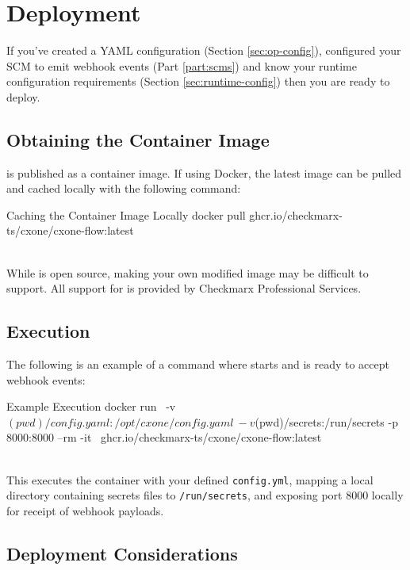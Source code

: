 \chapter{Deployment}\label{sec:deployment}

If you've created a YAML configuration (Section \ref{sec:op-config}), configured your SCM to emit webhook events
(Part \ref{part:scms}) and know your runtime configuration requirements (Section \ref{sec:runtime-config}) then
you are ready to deploy.

\section{Obtaining the Container Image}

\cxoneflow is published as a container image.  If using Docker, the latest image can be pulled and cached locally
with the following command:

\begin{code}{Caching the \cxoneflow Container Image Locally}{}{}
docker pull ghcr.io/checkmarx-ts/cxone/cxone-flow:latest
\end{code}

\noindent\\While \cxoneflow is open source, making your own modified image may be difficult to support.  All
support for \cxoneflow is provided by Checkmarx Professional Services.

\section{\cxoneflow Execution}

The following is an example of a command where \cxoneflow starts and is ready to accept webhook events:

\begin{code}{\cxoneflow Example Execution}{}{}
docker run \
    -v $(pwd)/config.yaml:/opt/cxone/config.yaml \
    -v $(pwd)/secrets:/run/secrets -p 8000:8000 --rm -it \ 
    ghcr.io/checkmarx-ts/cxone/cxone-flow:latest
\end{code}

\noindent\\This executes the container with your defined \texttt{config.yml}, mapping a local directory
containing secrets files to \texttt{/run/secrets}, and exposing port 8000 locally for receipt of 
webhook payloads.


\section{Deployment Considerations}

